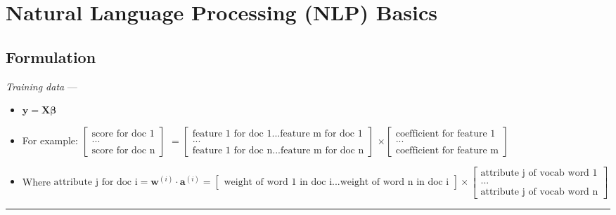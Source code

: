 \section{Natural Language Processing (NLP) Basics}
\subsection*{Formulation}
\emph{Training data} --- 
\begin{itemize}
    \item $\boldsymbol{y} = \boldsymbol{X} \boldsymbol{\beta}$
    \item For example: 
    $\begin{bmatrix}
    \textrm{score for doc 1} \\
    ...\\
    \textrm{score for doc n}
    \end{bmatrix}
    $ 
    $=
    \begin{bmatrix}
    \textrm{feature 1 for doc 1} ... \textrm{feature m for doc 1} \\
    ...\\
    \textrm{feature 1 for doc n} ... \textrm{feature m for doc n}
    \end{bmatrix}
    $
    $
    \times 
    \begin{bmatrix}
    \textrm{coefficient for feature 1} \\
    ...\\
    \textrm{coefficient for feature m}
    \end{bmatrix}
    $
    \item Where $\textrm{attribute j for doc i} = \boldsymbol{w}^{(i)} \cdot \boldsymbol{a}^{(i)} = 
    \begin{bmatrix}
    \textrm{weight of word 1 in doc i...weight of word n in doc i}
    \end{bmatrix}
    \times 
    \begin{bmatrix}
    \textrm{attribute j of vocab word 1} \\
    ...\\
    \textrm{attribute j of vocab word n}
    \end{bmatrix}
    $
\end{itemize}

{\color{lightgray}\hrule height 0.001mm}

